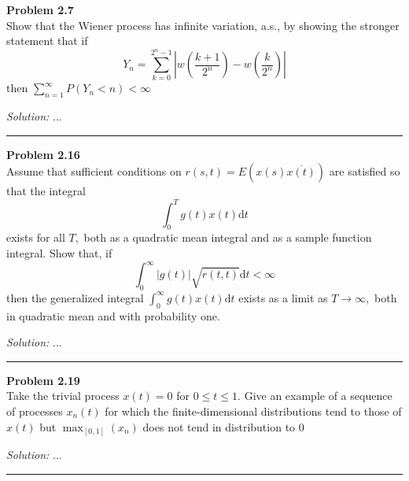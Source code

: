 \documentclass[a4paper, 11pt]{article}
\newenvironment{problem}[2][Problem]
    { \begin{mdframed}[backgroundcolor=gray!20] \textbf{#1 #2} \\}
    {  \end{mdframed}}
\newenvironment{solution}
    {\textit{Solution:}}
    {}
\begin{document}
\begin{problem}{2.7}
Show that the Wiener process has infinite variation, a.s., by showing the stronger statement that if
\[
Y_{n}=\sum_{k=0}^{2^{n}-1}\left|w\left(\frac{k+1}{2^{n}}\right)-w\left(\frac{k}{2^{n}}\right)\right|
\]
then $\sum_{n=1}^{\infty} P\left(Y_{n}<n\right)<\infty$
\end{problem}
\begin{solution}
	...
\end{solution} 

\noindent\rule{7in}{2.8pt}


\begin{problem}{2.16}
Assume that sufficient conditions on $r(s, t)=E(x(s) \overline{x(t)})$ are satisfied so that the integral
\[
\int_{0}^{T} g(t) x(t) \mathrm{d} t
\]
exists for all $T,$ both as a quadratic mean integral and as a sample function integral. Show that, if
\[
\int_{0}^{\infty}|g(t)| \sqrt{r(t, t)} \mathrm{d} t<\infty
\]
then the generalized integral $\int_{0}^{\infty} g(t) x(t) \mathrm{d} t$ exists as a limit as $T \rightarrow \infty,$ both in quadratic mean and with probability one.
\end{problem}
\begin{solution}
	...
\end{solution} 

\noindent\rule{7in}{2.8pt}


\begin{problem}{2.19}
Take the trivial process $x(t)=0$ for $0 \leq t \leq 1 .$ Give an example of a sequence of processes $x_{n}(t)$ for which the finite-dimensional distributions tend to those of $x(t)$ but $\max _{[0,1]}\left(x_{n}\right)$ does not tend in distribution to 0
\end{problem}
\begin{solution}
	...
\end{solution} 

\noindent\rule{7in}{2.8pt}
\end{document}
